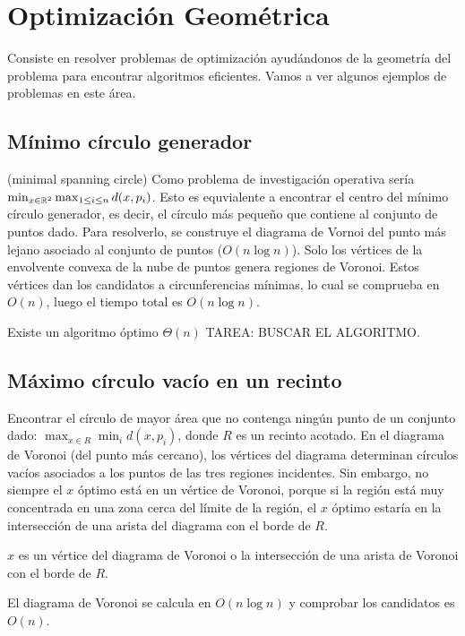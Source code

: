 \documentclass[TGyGC.tex]{subfiles}
\begin{document}
\chapter{Optimización Geométrica}
Consiste en resolver problemas de optimización ayudándonos de la geometría del problema para encontrar algoritmos eficientes. Vamos a ver algunos ejemplos de problemas en este área.

\section{Mínimo círculo generador}
(minimal spanning circle) Como problema de investigación operativa sería $\min_{x\in\mathbb{R}^2}\max_{1\leq i\leq n} d(x,p_i)$. Esto es equvialente a encontrar el centro del mínimo círculo generador, es decir, el círculo más pequeño que contiene al conjunto de puntos dado. Para resolverlo, se construye el diagrama de Vornoi del punto más lejano asociado al conjunto de puntos ($O(n\log n)$). Solo los vértices de la envolvente convexa de la nube de puntos genera regiones de Voronoi. Estos vértices dan los candidatos a circunferencias mínimas, lo cual se comprueba en $O(n)$, luego el tiempo total es $O(n\log n)$. 

Existe un algoritmo óptimo $\Theta(n)$ TAREA: BUSCAR EL ALGORITMO. 

\section{Máximo círculo vacío en un recinto}
Encontrar el círculo de mayor área que no contenga ningún punto de un conjunto dado: $\max_{x\in R}\min_i d(x,p_i)$, donde $R$ es un recinto acotado. En el diagrama de Voronoi (del punto más cercano), los vértices del diagrama determinan círculos vacíos asociados a los puntos de las tres regiones incidentes. Sin embargo, no siempre el $x$ óptimo está en un vértice de Voronoi, porque si la región está muy concentrada en una zona cerca del límite de la región, el $x$ óptimo estaría en la intersección de una arista del diagrama con el borde de $R$. 

\begin{prop}
$x$ es un vértice del diagrama de Voronoi o la intersección de una arista de Voronoi con el borde de $R$. 
\end{prop}

El diagrama de Voronoi se calcula en $O(n\log n)$ y comprobar los candidatos es $O(n)$. 
\end{document}

